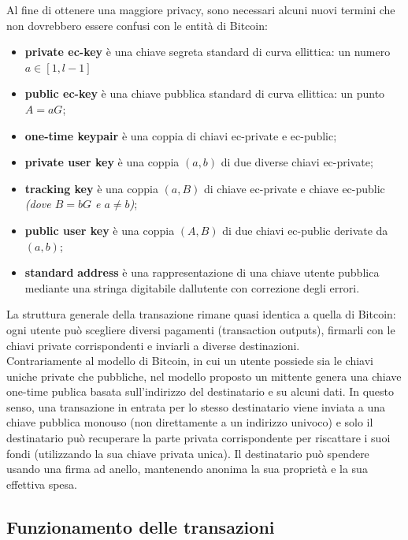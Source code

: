 Al fine di ottenere una maggiore privacy, sono necessari alcuni nuovi
termini che non dovrebbero essere confusi con le entità di Bitcoin:

\begin{itemize}
  \item
    \textbf{private ec-key} è una chiave segreta standard di curva
    ellittica: un numero $a \in [1,l-1]$
  \item
    \textbf{public ec-key} è una chiave pubblica standard di curva
    ellittica: un punto $A=aG$;
  \item
    \textbf{one-time keypair} è una coppia di chiavi ec-private e
    ec-public;
  \item
    \textbf{private user key} è una coppia \emph{$(a, b)$} di due diverse
    chiavi ec-private;
  \item
    \textbf{tracking key} è una coppia \emph{$(a, B)$} di chiave ec-private
    e chiave ec-public \emph{(dove $B=bG$ e $a \neq b$)};
  \item
    \textbf{public user key} è una coppia \emph{$(A, B)$} di due chiavi
    ec-public derivate da \emph{$(a, b)$};
  \item
    \textbf{standard} \textbf{address} è una rappresentazione di una
    chiave utente pubblica mediante una stringa digitabile
    dall\textquotesingle utente con correzione degli errori.
  \end{itemize}

La struttura generale della transazione rimane quasi identica a quella
di Bitcoin: ogni utente può scegliere diversi pagamenti (transaction
outputs), firmarli con le chiavi private corrispondenti e inviarli a
diverse destinazioni.\\
Contrariamente al modello di Bitcoin, in cui un utente possiede sia le
chiavi uniche private che pubbliche, nel modello proposto un mittente
genera una chiave one-time publica basata sull'indirizzo del
destinatario e su alcuni dati. In questo senso, una transazione in
entrata per lo stesso destinatario viene inviata a una chiave pubblica
monouso (non direttamente a un indirizzo univoco) e solo il destinatario
può recuperare la parte privata corrispondente per riscattare i suoi
fondi (utilizzando la sua chiave privata unica). Il destinatario può
spendere usando una firma ad anello, mantenendo anonima la sua proprietà
e la sua effettiva spesa.

\subsection{Funzionamento delle
transazioni}\label{funzionamento-delle-transazioni}

